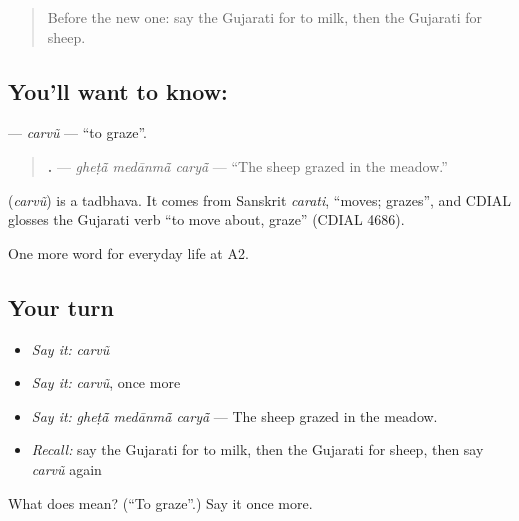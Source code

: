 \begin{quote}
Before the new one: say the Gujarati for to milk, then the Gujarati for sheep.
\end{quote}

\subsection*{You'll want to know: }
\textbf{} — \emph{carvũ} — \textquotedblleft{}to graze\textquotedblright{}.

\begin{quote}
\textbf{  .} — \emph{gheṭā̃ medānmā̃ caryā̃} — \textquotedblleft{}The sheep grazed in the meadow.\textquotedblright{}
\end{quote}

\begin{cousinweb}
\textbf{} (\emph{carvũ}) is a tadbhava. It comes from Sanskrit \emph{carati}, \textquotedblleft{}moves; grazes\textquotedblright{}, and CDIAL glosses the Gujarati verb \textquotedblleft{}to move about, graze\textquotedblright{} (CDIAL 4686).
\end{cousinweb}

\begin{grammarlens}[title={What you've built}]
One more word for everyday life at A2.
\end{grammarlens}

\subsection*{Your turn}
\begin{itemize}
\raggedright
  \item \emph{Say it:} \emph{carvũ}
  \item \emph{Say it:} \emph{carvũ}, once more
  \item \emph{Say it:} \emph{gheṭā̃ medānmā̃ caryā̃} — The sheep grazed in the meadow.
  \item \emph{Recall:} say the Gujarati for to milk, then the Gujarati for sheep, then say \emph{carvũ} again
\end{itemize}

\begin{tcolorbox}[breakable,colback=teal!4,colframe=teal!35!black,title={Before you move on}]
What does  mean? (\textquotedblleft{}To graze\textquotedblright{}.) Say it once more.
\end{tcolorbox}
